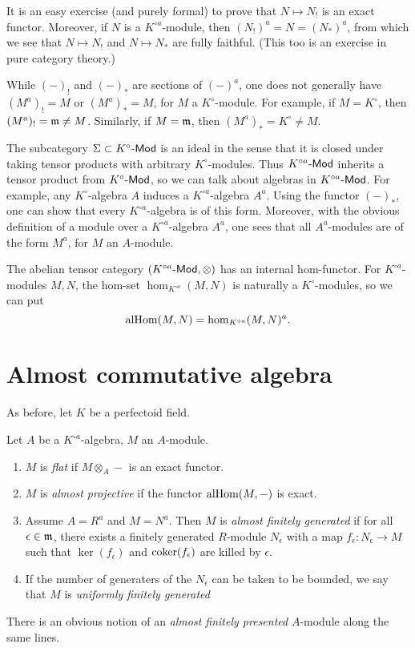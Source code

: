 \documentclass{article}
\begin{document}
It is an easy exercise (and purely formal) to prove that $N\mapsto N_!$ is an 
exact functor. Moreover, if $N$ is a $K^{\circ a}$-module, then 
$(N_!)^a = N = (N_\ast)^a$, from which we see that $N\mapsto N_!$ and 
$N\mapsto N_\ast$ are fully faithful. (This too is an exercise in pure category 
theory.) 

While $(-)_!$ and $(-)_\ast$ are sections of $(-)^a$, one does not generally 
have $(M^a)_!=M$ or $(M^a)_\ast=M$, for $M$ a $K^\circ$-module. For example, if 
$M=K^\circ$, then $(M^a)_! = \mathfrak{m}\ne M$. Similarly, if $M=\mathfrak{m}$, then 
$(M^a)_\ast = K^\circ\ne M$. 

The subcategory $\Sigma\subset K^\circ\textnormal{-}\mathsf{Mod}$ is an ideal in the sense that it is 
closed under taking tensor products with arbitrary $K^\circ$-modules. Thus 
$K^{\circ a}\textnormal{-}\mathsf{Mod}$ inherits a tensor product from $K^\circ\textnormal{-}\mathsf{Mod}$, so we can talk 
about algebras in $K^{\circ a}\textnormal{-}\mathsf{Mod}$. For example, any $K^\circ$-algebra $A$ 
induces a $K^{\circ a}$-algebra $A^a$. Using the functor $(-)_\ast$, one can 
show that every $K^{\circ a}$-algebra is of this form. Moreover, with the 
obvious definition of a module over a $K^{\circ a}$-algebra $A^a$, one sees that 
all $A^a$-modules are of the form $M^a$, for $M$ an $A$-module. 

The abelian tensor category $(K^{\circ a}\textnormal{-}\mathsf{Mod},\otimes)$ has an internal 
hom-functor. For $K^{\circ a}$-modules $M,N$, the hom-set 
$\hom_{K^{\circ a}}(M,N)$ is naturally a $K^\circ$-modules, so we can put 
\[
  \operatorname{alHom}(M,N) = \hom_{K^{\circ a}}(M,N)^a .
\]





\section{Almost commutative algebra}

As before, let $K$ be a perfectoid field. 

\begin{definition}
Let $A$ be a $K^{\circ a}$-algebra, $M$ an $A$-module. 
\begin{enumerate}
  \item $M$ is \emph{flat} if $M\otimes_A -$ is an exact functor. 
  \item $M$ is \emph{almost projective} if the functor $\operatorname{alHom}(M,-)$ is exact. 
  \item Assume $A=R^a$ and $M=N^a$. Then $M$ is \emph{almost finitely generated} 
    if for all $\epsilon\in \mathfrak{m}$, there exists a finitely generated 
    $R$-module $N_\epsilon$ with a map $f_\epsilon:N_\epsilon\to M$ such that 
    $\ker(f_\epsilon)$ and $\operatorname{coker}(f_\epsilon)$ are killed by $\epsilon$. 
  \item If the number of generaters of the $N_\epsilon$ can be taken to be 
    bounded, we say that $M$ is \emph{uniformly finitely generated}
\end{enumerate}
\end{definition}
There is an obvious notion of an \emph{almost finitely presented} $A$-module 
along the same lines. 
\end{document}

